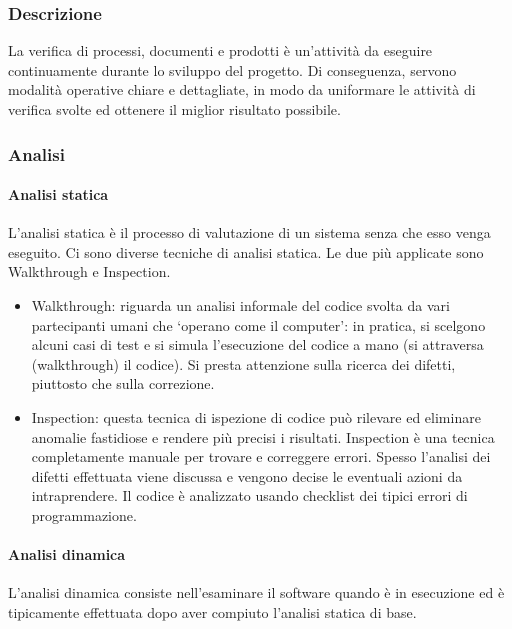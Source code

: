 \subsubsection{Descrizione}

La verifica di processi, documenti e prodotti è un’attività da eseguire continuamente
durante lo sviluppo del progetto. Di conseguenza, servono modalità operative chiare
e dettagliate, in modo da uniformare le attività di verifica svolte ed ottenere il miglior
risultato possibile.

\subsubsection{Analisi}

\paragraph{Analisi statica}


L’analisi statica è il processo di valutazione di un sistema senza che esso venga eseguito. Ci sono diverse tecniche di analisi statica. Le due più applicate sono Walkthrough e Inspection.
\begin{itemize}
\item  Walkthrough: riguarda un analisi informale del codice svolta da vari partecipanti umani che ‘operano come il computer’: in pratica, si scelgono alcuni casi di test e si simula
l’esecuzione del codice a mano (si attraversa (walkthrough) il codice). Si presta attenzione sulla ricerca dei difetti, piuttosto che sulla correzione.

\item  Inspection: questa tecnica di ispezione di codice può rilevare
  ed eliminare anomalie fastidiose e rendere più precisi i
  risultati. Inspection è una tecnica completamente manuale per
  trovare e correggere errori. Spesso l’analisi dei difetti effettuata
  viene discussa e vengono decise le eventuali azioni da
  intraprendere. Il codice è analizzato usando checklist dei tipici
  errori di programmazione.  
\end{itemize}

\paragraph{Analisi dinamica }

L’analisi dinamica consiste nell’esaminare il software  quando è in esecuzione ed è tipicamente effettuata dopo aver compiuto l’analisi statica di base.

